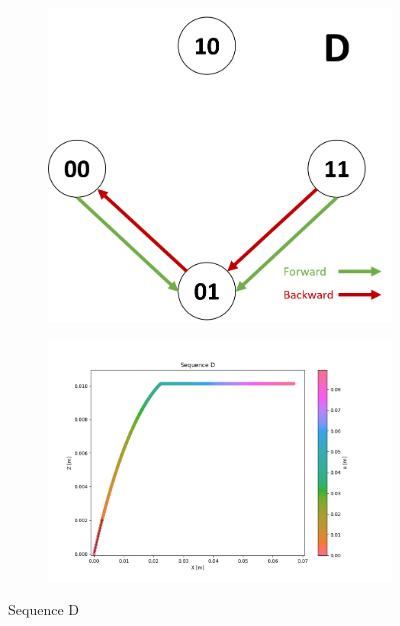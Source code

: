         \begin{figure}[h]
            \begin{subfigure}{.3\textwidth}
            \includegraphics[width=\textwidth]{images/S_D.png}
            \end{subfigure}%
            \begin{subfigure}{.7\textwidth}
            \includegraphics[width=\textwidth]{images/D.png}
            \end{subfigure}
            \caption{Sequence D}
        \end{figure}
